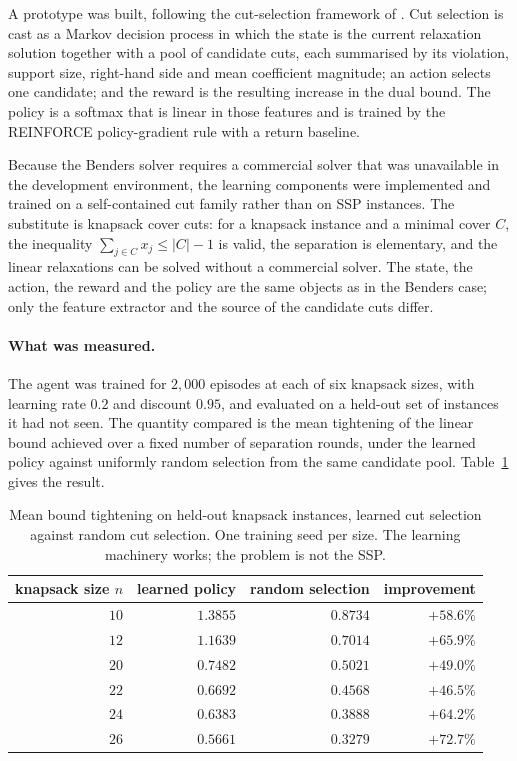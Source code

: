 A prototype was built, following the cut-selection framework of \citet{Tang2020}. Cut
selection is cast as a Markov decision process in which the state is the current
relaxation solution together with a pool of candidate cuts, each summarised by its
violation, support size, right-hand side and mean coefficient magnitude; an action
selects one candidate; and the reward is the resulting increase in the dual bound. The
policy is a softmax that is linear in those features and is trained by the REINFORCE
policy-gradient rule with a return baseline.

Because the Benders solver requires a commercial solver that was unavailable in the
development environment, the learning components were implemented and trained on a
self-contained cut family rather than on SSP instances. The substitute is knapsack
cover cuts: for a knapsack instance and a minimal cover $C$, the inequality
$\sum_{j\in C}x_j\le\lvert C\rvert-1$ is valid, the separation is elementary, and the
linear relaxations can be solved without a commercial solver. The state, the action,
the reward and the policy are the same objects as in the Benders case; only the feature
extractor and the source of the candidate cuts differ.

\paragraph{What was measured.}
The agent was trained for $2{,}000$ episodes at each of six knapsack sizes, with
learning rate $0.2$ and discount $0.95$, and evaluated on a held-out set of instances
it had not seen. The quantity compared is the mean tightening of the linear bound
achieved over a fixed number of separation rounds, under the learned policy against
uniformly random selection from the same candidate pool. Table~\ref{tab:rl} gives the
result.

\begin{table}[h]\centering
\footnotesize
\begin{tabular}{@{}rrrr@{}}
\toprule
knapsack size $n$ & learned policy & random selection & improvement\\
\midrule
$10$ & $1.3855$ & $0.8734$ & $+58.6\%$\\
$12$ & $1.1639$ & $0.7014$ & $+65.9\%$\\
$20$ & $0.7482$ & $0.5021$ & $+49.0\%$\\
$22$ & $0.6692$ & $0.4568$ & $+46.5\%$\\
$24$ & $0.6383$ & $0.3888$ & $+64.2\%$\\
$26$ & $0.5661$ & $0.3279$ & $+72.7\%$\\
\bottomrule
\end{tabular}
\caption{Mean bound tightening on held-out knapsack instances, learned cut selection
against random cut selection. One training seed per size. The learning machinery works;
the problem is not the SSP.}
\label{tab:rl}
\end{table}

